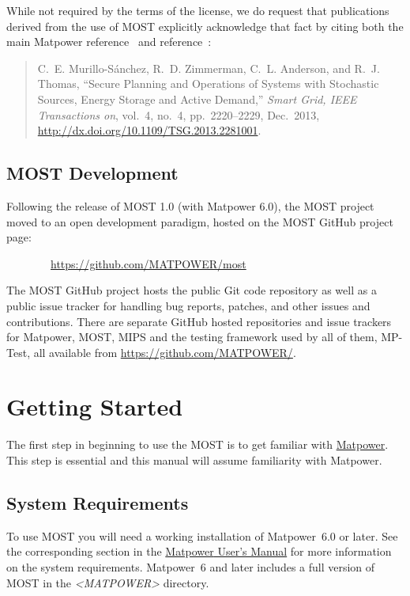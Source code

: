 \documentclass[12pt]{article}
\newcommand{\mpver}[0]{6.0}
\newcommand{\matpower}[0]{{\sc Matpower}}
\newcommand{\matpowerurl}[0]{http://www.pserc.cornell.edu/matpower/}
\newcommand{\matpowerlink}[0]{\href{\matpowerurl}{\matpower{}}}
\newcommand{\mptest}[0]{{MP-Test}}
\newcommand{\mips}[0]{{MIPS}}
\newcommand{\most}[0]{{MOST}}
\newcommand{\mosturl}[0]{https://github.com/MATPOWER/most}
\newcommand{\code}[1]{{\relsize{-0.5}{\tt{{#1}}}}}  %
\newcommand{\mppath}[1]{\textsf{\textsl{{\relsize{-1.0}\textless{}\mbox{MATPOWER}\textgreater{}}}}\code{{#1}}}  %
\newcommand{\mostpath}[1]{\mppath{}\code{/most{#1}}}
\newcommand{\mumurl}[0]{http://www.pserc.cornell.edu/matpower/docs/MATPOWER-manual-\mpver.pdf}
\newcommand{\mum}[0]{\href{\mumurl}{\matpower{} User's Manual}}
\numberwithin{equation}{section}
\numberwithin{table}{section}
\numberwithin{figure}{section}
\begin{document}
While not required by the terms of the license, we do request that publications derived from the use of \most{} explicitly acknowledge that fact by citing both the main \matpower{} reference~\cite{zimmerman2011} and reference~\cite{murillo-sanchez2013a}:

\begin{quote}
\footnotesize
C.~E. Murillo-S{\'a}nchez, R.~D. Zimmerman, C.~L. Anderson, and R.~J. Thomas, ``Secure Planning and Operations of Systems with Stochastic Sources, Energy Storage and Active Demand,'' \emph{Smart Grid, IEEE Transactions on}, vol.~4, no.~4, pp.~2220--2229, Dec.~2013, \url{http://dx.doi.org/10.1109/TSG.2013.2281001}.
\end{quote}

\subsection{\most{} Development}
\label{sec:development}

Following the release of \most{} 1.0 (with \matpower{} 6.0), the \most{} project moved to an open development paradigm, hosted on the \most{} GitHub project page:

\bigskip

~~~~~~~~\url{\mosturl}

\bigskip

The \most{} GitHub project hosts the public Git code repository as well as a public issue tracker for handling bug reports, patches, and other issues and contributions. There are separate GitHub hosted repositories and issue trackers for \matpower{}, \most{}, \mips{} and the testing framework used by all of them, \mptest{}, all available from \url{https://github.com/MATPOWER/}.


\clearpage
\section{Getting Started}

The first step in beginning to use the \most{} is to get familiar with \matpowerlink{}. This step is essential and this manual will assume familiarity with \matpower{}.

\subsection{System Requirements}
\label{sec:sysreq}
To use \most{} you will need a working installation of \matpower{}~\mpver{} or later. See the corresponding section in the \mum{} for more information on the system requirements.
\matpower{}~6 and later includes a full version of \most{} in the \mostpath{} directory.
\end{document}
